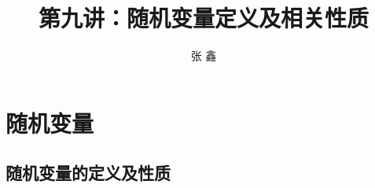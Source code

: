 \setcounter{section}{1}
\section{随机变量}
\title [概率论]{第九讲：随机变量定义及相关性质}
\author [张鑫 {\rm Email: xzhangseu@seu.edu.cn} ]{\large 张 鑫}
\date{}



{ 
	\begin{frame}
		\titlepage
	\end{frame}
}

\addtocounter{framenumber}{-3}  %

\subsection{随机变量的定义及性质}


